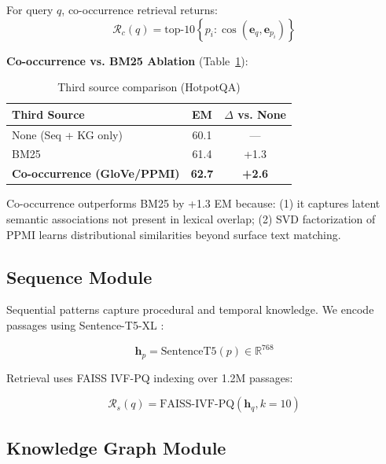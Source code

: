 \documentclass[10pt,twocolumn]{article}
\begin{document}
For query $q$, co-occurrence retrieval returns:
\begin{equation}
\mathcal{R}_c(q) = \text{top-}10 \left\{ p_i : \cos(\mathbf{e}_q, \mathbf{e}_{p_i}) \right\}
\end{equation}

\textbf{Co-occurrence vs. BM25 Ablation} (Table~\ref{tab:cooc_vs_bm25}):

\begin{table}[h]
\centering
\caption{Third source comparison (HotpotQA)}
\label{tab:cooc_vs_bm25}
\small
\begin{tabular}{@{}lcc@{}}
\toprule
\textbf{Third Source} & \textbf{EM} & \textbf{$\Delta$ vs. None} \\
\midrule
None (Seq + KG only) & 60.1 & --- \\
BM25 & 61.4 & +1.3 \\
\textbf{Co-occurrence (GloVe/PPMI)} & \textbf{62.7} & \textbf{+2.6} \\
\bottomrule
\end{tabular}
\end{table}

Co-occurrence outperforms BM25 by +1.3 EM because: (1) it captures latent semantic associations not present in lexical overlap; (2) SVD factorization of PPMI learns distributional similarities beyond surface text matching.


\subsection{Sequence Module}

Sequential patterns capture procedural and temporal knowledge. We encode passages using Sentence-T5-XL \cite{ni2022sentence_t5}:

\begin{equation}
\mathbf{h}_p = \text{SentenceT5}(p) \in \mathbb{R}^{768}
\end{equation}

Retrieval uses FAISS IVF-PQ indexing \cite{johnson2019faiss} over 1.2M passages:

\begin{equation}
\mathcal{R}_s(q) = \text{FAISS-IVF-PQ}(\mathbf{h}_q, k=10)
\end{equation}


\subsection{Knowledge Graph Module}
\label{sec:ontology}
\end{document}
